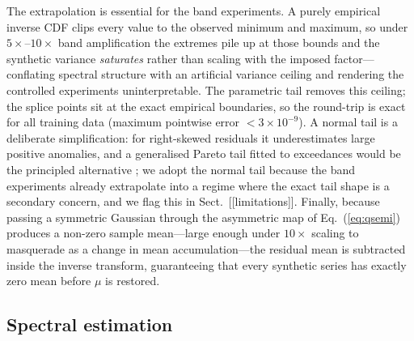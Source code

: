 The extrapolation is essential for the band experiments. A purely empirical
inverse CDF clips every value to the observed minimum and maximum, so under
$5\times$--$10\times$ band amplification the extremes pile up at those
bounds and the synthetic variance \emph{saturates} rather than scaling with
the imposed factor---conflating spectral structure with an artificial
variance ceiling and rendering the controlled experiments
uninterpretable. The parametric tail removes this ceiling; the splice
points sit at the exact empirical boundaries, so the round-trip is exact
for all training data (maximum pointwise error $<3\times10^{-9}$). A normal
tail is a deliberate simplification: for right-skewed residuals it
underestimates large positive anomalies, and a generalised Pareto tail
fitted to exceedances would be the principled alternative
\citep{coles2001}; we adopt the normal tail because the band experiments
already extrapolate into a regime where the exact tail shape is a secondary
concern, and we flag this in Sect.~[[limitations]]. Finally, because passing
a symmetric Gaussian through the asymmetric map of Eq.~(\ref{eq:qsemi})
produces a non-zero sample mean---large enough under $10\times$ scaling to
masquerade as a change in mean accumulation---the residual mean is
subtracted inside the inverse transform, guaranteeing that every synthetic
series has exactly zero mean before $\mu$ is restored.

\subsection{Spectral estimation}\label{sec:psd}

